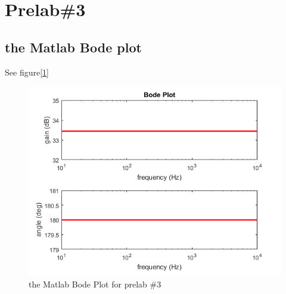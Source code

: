 \documentclass{IEEEtran}
\begin{document}
	\section{\textbf{Prelab\#3}}
	\subsection{the Matlab Bode plot}
	See figure[\ref{fig:301}]
	\begin{figure}[!htbp]
		\centering
		\begin{framed}
			\includegraphics[width=\linewidth]{images/3_1.PNG}
			\caption{the Matlab Bode Plot for prelab \#3}
			\label{fig:301}
		\end{framed}
	\end{figure}
\end{document}
